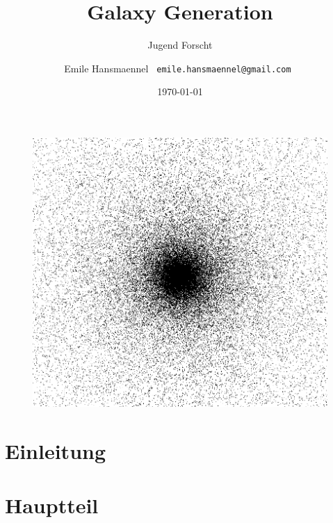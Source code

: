 \documentclass[a4paper,10pt]{scrartcl}
\begin{document}
\title{Galaxy Generation}
\subtitle{Jugend Forscht \the\year}
\author{ Emile Hansmaennel \texttt{ emile.hansmaennel@gmail.com }}
\date{\today}

\maketitle

\begin{figure}[h]
  \centering
  \includegraphics[width=120mm, trim={0 8.5cm 0 8.5cm}, clip]{figs/galaxy}
  \captionsetup{labelformat=empty}
  \caption{}
 \end{figure}

\begin{abstract}

\end{abstract}

\thispagestyle{empty}
\clearpage
\newpage
\setcounter{page}{1}

\tableofcontents
\newpage

\section{Einleitung} \label{Einleitung}
% 

\newpage

\section{Hauptteil} \label{Hauptteil}
% 

\newpage
\end{document}
